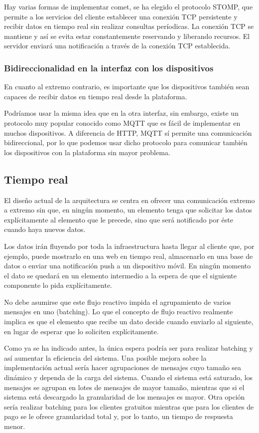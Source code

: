 Hay varias formas de implementar comet, se ha elegido el protocolo STOMP, que
permite a los servicios del cliente establecer una conexión TCP persistente y
recibir datos en tiempo real sin realizar consultas períodicas. La conexión TCP
se mantiene y así se evita estar constantemente reservando y liberando recursos.
El servidor enviará una notificación a través de la conexión TCP establecida.

\subsubsection{Bidireccionalidad en la interfaz con los dispositivos}

En cuanto al extremo contrario, es importante que los dispositivos también sean
capaces de recibir datos en tiempo real desde la plataforma.

Podríamos usar la misma idea que en la otra interfaz, sin embargo, existe un
protocolo muy popular conocido como MQTT que es fácil de implementar en muchos
dispositivos. A diferencia de HTTP, MQTT sí permite una comunicación
bidireccional, por lo que podemos usar dicho protocolo para comunicar también
los dispositivos con la plataforma sin mayor problema.

\subsection{Tiempo real}

El diseño actual de la arquitectura se centra en ofrecer una comunicación
extremo a extremo sin que, en ningún momento, un elemento tenga que solicitar
los datos explícitamente al elemento que le precede, sino que será notificado
por éste cuando haya nuevos datos.

Los datos irán fluyendo por toda la infraestructura hasta llegar al cliente que,
por ejemplo, puede mostrarlo en una web en tiempo real, almacenarlo en una base
de datos o enviar una notificación push a un dispositivo móvil. En ningún
momento el dato se quedará en un elemento intermedio a la espera de que el
siguiente componente lo pida explícitamente.

No debe asumirse que este flujo reactivo impida el agrupamiento de varios
mensajes en uno (batching). Lo que el concepto de flujo reactivo realmente
implica es que el elemento que recibe un dato decide cuando enviarlo al
siguiente, en lugar de esperar que lo soliciten explícitamente.

Como ya se ha indicado antes, la única espera podría ser para realizar batching
y así aumentar la eficiencia del sistema. Una posible mejora sobre la
implementación actual sería hacer agrupaciones de mensajes cuyo tamaño sea
dinámico y dependa de la carga del sistema. Cuando el sistema está saturado, los
mensajes se agrupan en lotes de mensajes de mayor tamaño, mientras que si el
sistema está descargado la granularidad de los mensajes es mayor. Otra opción
sería realizar batching para los clientes gratuitos mientras que para los
clientes de pago se le ofrece granularidad total y, por lo tanto, un tiempo de
respuesta menor.

